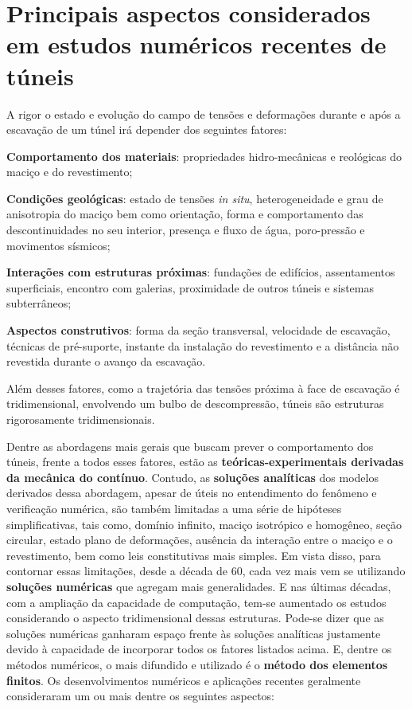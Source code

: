 \section{Principais aspectos considerados em estudos numéricos recentes de túneis}

A rigor o estado e evolução do campo de tensões e deformações durante e após a escavação de um túnel irá depender dos seguintes fatores:

\begin{alineas}
	
	\item \textbf{Comportamento dos materiais}: propriedades hidro-mecânicas e reológicas do maciço e do revestimento;
	
	\item \textbf{Condições geológicas}: estado de tensões \textit{in situ}, heterogeneidade e grau de anisotropia do maciço bem como orientação, forma e comportamento das descontinuidades no seu interior, presença e fluxo de água, poro-pressão e movimentos sísmicos;
	
	\item \textbf{Interações com estruturas próximas}: fundações de edifícios, assentamentos superficiais, encontro com galerias, proximidade de outros túneis e sistemas subterrâneos;
	
	\item \textbf{Aspectos construtivos}: forma da seção transversal, velocidade de escavação, técnicas de pré-suporte, instante da instalação do revestimento e a distância não revestida durante o avanço da escavação.
	
\end{alineas}

Além desses fatores, como a trajetória das tensões próxima à face de escavação é tridimensional, envolvendo um bulbo de descompressão, túneis são estruturas rigorosamente tridimensionais.

Dentre as abordagens mais gerais que buscam prever o comportamento dos túneis, frente a todos esses fatores, estão as \textbf{teóricas-experimentais derivadas da mecânica do contínuo}. Contudo, as \textbf{soluções analíticas} dos modelos derivados dessa abordagem, apesar de úteis no entendimento do fenômeno e verificação numérica, são também limitadas a uma série de hipóteses simplificativas, tais como, domínio infinito, maciço isotrópico e homogêneo, seção circular, estado plano de deformações, ausência da interação entre o maciço e o revestimento, bem como leis constitutivas mais simples. Em vista disso, para contornar essas limitações, desde a década de 60, cada vez mais vem se utilizando \textbf{soluções numéricas} que agregam mais generalidades. E nas últimas décadas, com a ampliação da capacidade de computação, tem-se aumentado os estudos considerando o aspecto tridimensional dessas estruturas. Pode-se dizer que as soluções numéricas ganharam espaço frente às soluções analíticas justamente devido à capacidade de incorporar todos os fatores listados acima. E, dentre os métodos numéricos, o mais difundido e utilizado é o \textbf{método dos elementos finitos}. Os desenvolvimentos numéricos e aplicações recentes geralmente consideraram um ou mais dentre os seguintes aspectos:

